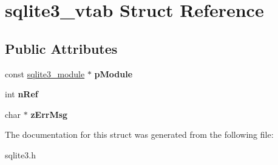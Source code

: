 \hypertarget{structsqlite3__vtab}{}\section{sqlite3\+\_\+vtab Struct Reference}
\label{structsqlite3__vtab}
\subsection*{Public Attributes}
\begin{DoxyCompactItemize}
\item 
\mbox{\label{structsqlite3__vtab_a4ef8198ca611b73a9b23054dd1e91e2b}} 
const \mbox{\hyperlink{structsqlite3__module}{sqlite3\+\_\+module}} $\ast$ {\bfseries p\+Module}
\item 
\mbox{\label{structsqlite3__vtab_ab3c80d385849bdd82363a0df7d6fcba8}} 
int {\bfseries n\+Ref}
\item 
\mbox{\label{structsqlite3__vtab_afc50eadfdd7cef876633d460deba48d6}} 
char $\ast$ {\bfseries z\+Err\+Msg}
\end{DoxyCompactItemize}


The documentation for this struct was generated from the following file\+:\begin{DoxyCompactItemize}
\item 
sqlite3.\+h\end{DoxyCompactItemize}
